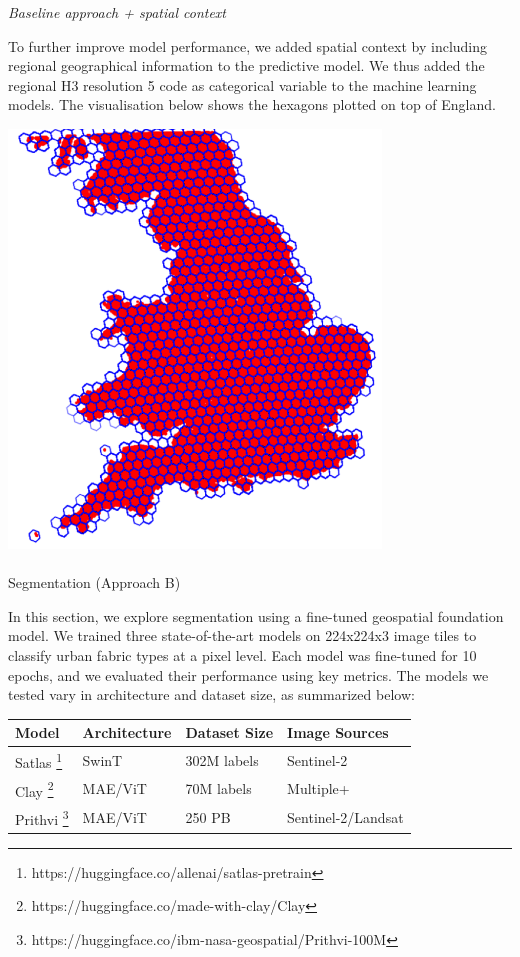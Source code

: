 \documentclass[
  letterpaper,
  DIV=11,
  numbers=noendperiod]{scrartcl}
\makeatletter
\let\oldparagraph\paragraph
\renewcommand{\paragraph}{
    \@ifstar
      \xxxParagraphStar
      \xxxParagraphNoStar
  }
\newcommand{\xxxParagraphStar}[1]{\oldparagraph*{#1}\mbox{}}
\newcommand{\xxxParagraphNoStar}[1]{\oldparagraph{#1}\mbox{}}
\makeatother
\begin{document}
\emph{Baseline approach + spatial context}

To further improve model performance, we added spatial context by
including regional geographical information to the predictive model. We
thus added the regional H3 resolution 5 code as categorical variable to
the machine learning models. The visualisation below shows the hexagons
plotted on top of England.

\begin{center}
\includegraphics[width=\linewidth,height=4.375in,keepaspectratio]{../figures/algo_design/hex_level5.png}
\end{center}

\paragraph{Segmentation (Approach B)}\label{segmentation-approach-b}

In this section, we explore segmentation using a fine-tuned geospatial
foundation model. We trained three state-of-the-art models on 224x224x3
image tiles to classify urban fabric types at a pixel level. Each model
was fine-tuned for 10 epochs, and we evaluated their performance using
key metrics. The models we tested vary in architecture and dataset size,
as summarized below:

\begin{longtable}[]{@{}llll@{}}
\toprule\noalign{}
Model & Architecture & Dataset Size & Image Sources \\
\midrule\noalign{}
\endhead
\bottomrule\noalign{}
\endlastfoot
Satlas \footnote{https://huggingface.co/allenai/satlas-pretrain} & SwinT
& 302M labels & Sentinel-2 \\
Clay \footnote{https://huggingface.co/made-with-clay/Clay} & MAE/ViT &
70M labels & Multiple+ \\
Prithvi \footnote{https://huggingface.co/ibm-nasa-geospatial/Prithvi-100M}
& MAE/ViT & 250 PB & Sentinel-2/Landsat \\
\end{longtable}
\end{document}
